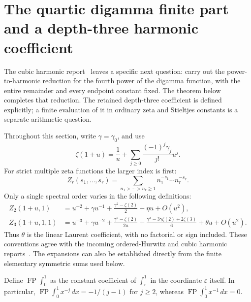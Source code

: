 
\section{The quartic digamma finite part and a depth-three harmonic coefficient}
\label{q4:section}

The cubic harmonic report~\cite{IncomingCubic} leaves a specific
next question: carry out the
power-to-harmonic reduction for the fourth power of the digamma function,
with the entire remainder and every endpoint constant fixed.  The theorem
below completes that reduction.  The retained depth-three coefficient is
defined explicitly; a finite evaluation of it in ordinary zeta and
Stieltjes constants is a separate arithmetic question.

Throughout this section, write $\gamma=\gamma_0$, and use
\[
 \zeta(1+u)=\frac1u+\sum_{j\geq0}\frac{(-1)^j\gamma_j}{j!}u^j.
\]
For strict multiple zeta functions the larger index is first:
\[
 Z_r(s_1,\ldots,s_r)
 =\sum_{n_1>\cdots>n_r\geq1}n_1^{-s_1}\cdots n_r^{-s_r}.
\]
Only a single spectral order varies in the following definitions:
\begin{align}
 Z_2(1+u,1)
 &=u^{-2}+\gamma u^{-1}+\frac{\gamma^2-\zeta(2)}2
       +\eta u+O(u^2),\label{q4:eta}\\
 Z_3(1+u,1,1)
 &=u^{-3}+\gamma u^{-2}
       +\frac{\gamma^2-\zeta(2)}{2u}
       +\frac{\gamma^3-3\gamma\zeta(2)+2\zeta(3)}6
       +\theta u+O(u^2).\label{q4:theta}
\end{align}
Thus $\theta$ is the linear Laurent coefficient, with no factorial or sign
included.  These conventions agree with the incoming ordered-Hurwitz and
cubic harmonic reports~\cite{IncomingOrdered,IncomingCubic}.
The expansions can also be established directly
from the finite elementary symmetric sums used below.

Define $\operatorname{FP}\int_0^1$ as the constant coefficient of
$\int_\varepsilon^1$ in the coordinate $\varepsilon$ itself.  In particular,
$\operatorname{FP}\int_0^1x^{-j}\,dx=-1/(j-1)$ for $j\geq2$, whereas
$\operatorname{FP}\int_0^1x^{-1}\,dx=0$.

